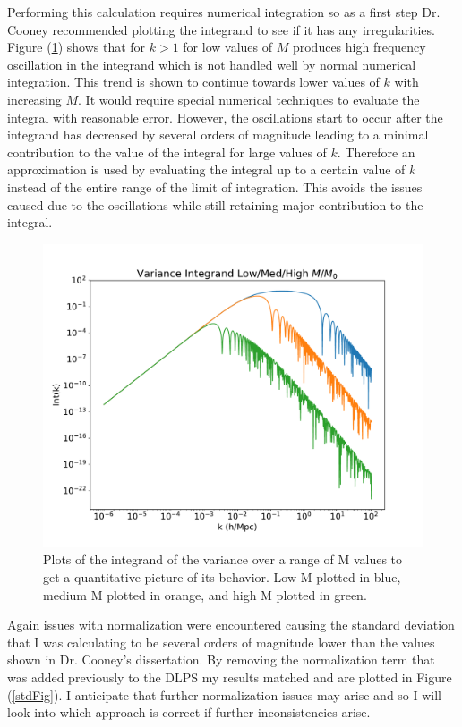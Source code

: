 \documentclass[12pt]{article}
\begin{document}
Performing this calculation requires numerical integration so as a first step Dr. Cooney recommended plotting the integrand to see if it has any irregularities. Figure (\ref{intFig}) shows that for $k > 1$ for low values of $M$ produces high frequency oscillation in the integrand which is not handled well by normal numerical integration. This trend is shown to continue towards lower values of $k$ with increasing $M$. It would require special numerical techniques to evaluate the integral with reasonable error. However, the oscillations start to occur after the integrand has decreased by several orders of magnitude leading to a minimal contribution to the value of the integral for large values of $k$. Therefore an approximation is used by evaluating the integral up to a certain value of $k$ instead of the entire range of the limit of integration. This avoids the issues caused due to the oscillations while still retaining major contribution to the integral.

\begin{figure}[!ht]
    \centering
    \includegraphics[width=0.8\linewidth,keepaspectratio=false]{figures/VARIntALL.pdf}
    \caption{Plots of the integrand of the variance over a range of M values to get a quantitative picture of its behavior. Low M plotted in blue, medium M plotted in orange, and high M plotted in green.}
    \label{intFig}
\end{figure}

Again issues with normalization were encountered causing the standard deviation that I was calculating to be several orders of magnitude lower than the values shown in Dr. Cooney's dissertation. By removing the normalization term that was added previously to the DLPS my results matched and are plotted in Figure (\ref{stdFig}). I anticipate that further normalization issues may arise and so I will look into which approach is correct if further inconsistencies arise.
\end{document}
